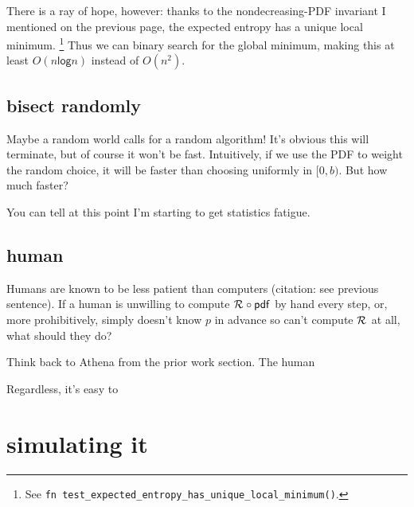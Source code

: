 \documentclass[11pt]{sigplanconf}
\begin{document}

There is a ray of hope, however:
thanks to the nondecreasing-PDF invariant I mentioned on the previous page,
the expected entropy has a unique local minimum.%
\footnote{See {\tt fn test\_expected\_entropy\_has\_unique\_local\_minimum()}.}
Thus we can binary search for the global minimum, making this at least $O(n\mathsf{log}n)$
instead of $O(n^2)$.

\subsection{bisect randomly}

Maybe a random world calls for a random algorithm!
It's obvious this will terminate, but of course it won't be fast.
Intuitively, if we use the PDF to weight the random choice, it will be faster than choosing uniformly in $[0,b)$.
But how much faster?

You can tell at this point I'm starting to get statistics fatigue.

\subsection{human}

Humans are known to be less patient than computers (citation: see previous sentence).
If a human is unwilling to compute $\mathcal{R}_{} \circ \mathsf{pdf}$ by hand every step,
or, more prohibitively,
simply doesn't know $p$ in advance so can't compute $\mathcal{R}_{}$ at all,
what should they do?

Think back to Athena from the prior work section.
The human



Regardless, it's easy to 



\section{simulating it}
\end{document}
